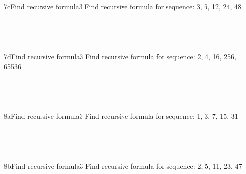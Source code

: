 \documentclass[a4paper,12pt]{book}
\begin{document}
    ~\\
    
    \hrulefill
    
    ~\\
    \begin{answersheetquestion}{7c}{Find recursive formula}{3}
        Find recursive formula for sequence: 3, 6, 12, 24, 48
        \iftoggle{answerkey}{ \begin{answer} $a_{1} = 3$; $a_{n} = 2 \cdot a_{n-1}$ \end{answer} }{ { ~\\ \raisebox{0pt}[2cm][0pt]{  } } }
    \end{answersheetquestion}

    ~\\
    
    \hrulefill
    
    ~\\
    \begin{answersheetquestion}{7d}{Find recursive formula}{3}
        Find recursive formula for sequence: 2, 4, 16, 256, 65536
        \iftoggle{answerkey}{ \begin{answer} $a_{1} = 2$; $a_{n} = (a_{n-1})^{2}$ \end{answer} }{ { ~\\ \raisebox{0pt}[2cm][0pt]{  } } }
    \end{answersheetquestion}

    ~\\
    
    \hrulefill
    
    ~\\
    \begin{answersheetquestion}{8a}{Find recursive formula}{3}
        Find recursive formula for sequence: 1, 3, 7, 15, 31
        \iftoggle{answerkey}{ \begin{answer} $a_{1} = 1$; $a_{n} = 2 \cdot a_{n-1} + 1$ \end{answer} }{ { ~\\ \raisebox{0pt}[2cm][0pt]{  } } }
    \end{answersheetquestion}

    ~\\
    
    \hrulefill
    
    ~\\
    \begin{answersheetquestion}{8b}{Find recursive formula}{3}
        Find recursive formula for sequence: 2, 5, 11, 23, 47
        \iftoggle{answerkey}{ \begin{answer} $a_{1} = 2$; $a_{n} = 2 \cdot a_{n-1} + 1$ \end{answer} }{ { ~\\ \raisebox{0pt}[2cm][0pt]{  } } }
    \end{answersheetquestion}
\end{document}
